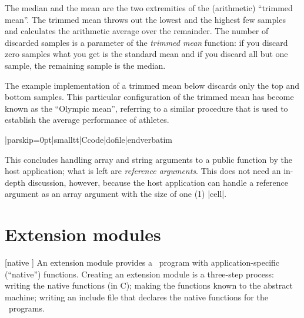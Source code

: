  
The median and the mean are the two extremities of the (arithmetic) ``trimmed
mean''. The trimmed mean throws out the lowest and the highest few samples and
calculates the arithmetic average over the remainder. The number of discarded samples
is a parameter of the {\it trimmed mean\/} function: if you discard zero samples
what you get is the standard mean and if you discard all but one sample, the
remaining sample is the median.

The example implementation of a trimmed mean below discards only the top and
bottom samples. This particular configuration of the trimmed mean has become
known as the ``Olympic mean'', referring to a similar procedure that is used to
establish the average performance of athletes.

\bigskip{}
\verbatim|parskip=0pt|smalltt|Ccode|dofile|endverbatim\endlistingx

This concludes handling array and string arguments to a public function by the
host application; what is left are {\it reference arguments}. This does not need
an in-depth discussion, however, because the host application can handle a reference
argument as an array argument with the size of one (1) |cell|.


\chapter{Extension modules}
 [native \midtilde] 
An extension module provides a \Small\ program with application-specific
(``native'') functions. Creating an extension module is a three-step process:
\beginlist{15pt}\compactlist
\list{\lnumber} writing the native functions (in C);
\list{\lnumber} making the functions known to the abstract machine;
\list{\lnumber} writing an include file that declares the native functions
  for the \Small\ programs.
\endlist

